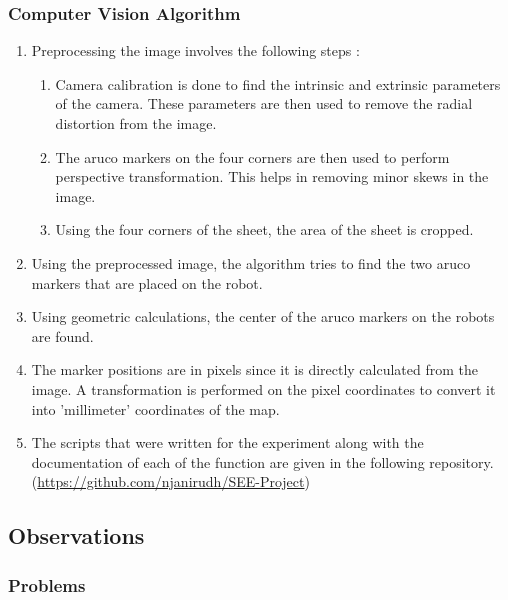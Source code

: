 \documentclass[10pt,a4paper]{article}
\begin{document}
\subsubsection{Computer Vision Algorithm}

\begin{enumerate}
		\item
		Preprocessing the image involves the following steps :
		\vspace{0.2cm}
		\begin{enumerate}
			\item
			Camera calibration is done to find the intrinsic and extrinsic parameters of the camera.	These parameters are then used to remove the radial distortion from the image.
			\item
			The aruco markers on the four corners are then used to perform perspective transformation. This helps in removing minor skews in the image.
			\item
			Using the four corners of the sheet, the area of the sheet is cropped.			
		\end{enumerate}
		\vspace{0.3cm}
		\item
		Using the preprocessed image, the algorithm tries to find the two aruco markers that are placed on the robot.
		\item
		Using geometric calculations, the center of the aruco markers on the robots are found. 
		\item
		The marker positions are in pixels since it is directly calculated from the image. A transformation is performed on the pixel coordinates to convert it into 'millimeter' coordinates of the map.
		\item
		The scripts that were written for the experiment along with the documentation of each of the function are given in the following repository. (\href{https://github.com/njanirudh/SEE-Project}{https://github.com/njanirudh/SEE-Project})
\end{enumerate}

\subsection{Observations}

\subsubsection{Problems}
\end{document}
